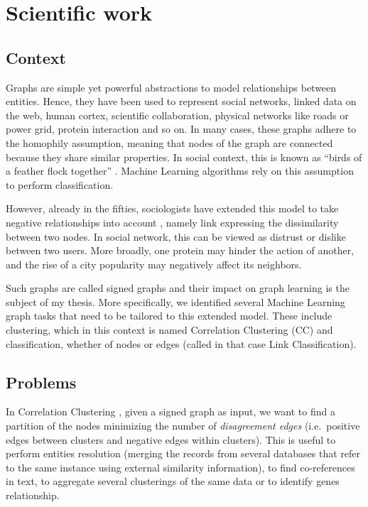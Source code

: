 \section{Scientific work}\label{scientific-work}

\subsection{Context}\label{context}

Graphs are simple yet powerful abstractions to model relationships between
entities. Hence, they have been used to represent social networks, linked data
on the web, human cortex, scientific collaboration, physical networks like
roads or power grid, protein interaction and so on. In many cases, these graphs
adhere to the homophily assumption, meaning that nodes of the graph are
connected because they share similar properties. In social context, this is
known as ``birds of a feather flock together'' \autocite{homophily01}. Machine
Learning algorithms rely on this assumption to perform classification.

However, already in the fifties, sociologists have extended this model to take
negative relationships into account \autocites{harary1953}{Cartwright56},
namely link expressing the dissimilarity between two nodes. In social network,
this can be viewed as distrust or dislike between two users. More broadly, one
protein may hinder the action of another, and the rise of a city popularity may
negatively affect its neighbors.

Such graphs are called signed graphs and their impact on graph learning is the
subject of my thesis. More specifically, we identified several Machine Learning
graph tasks that need to be tailored to this extended model. These include
clustering, which in this context is named Correlation Clustering (CC) and
classification, whether of nodes or edges (called in that case Link
Classification).

\subsection{Problems}\label{problems}

In Correlation Clustering \autocite{Bansal2002}, given a signed graph as input,
we want to find a partition of the nodes minimizing the number of
\emph{disagreement edges} (i.e.~positive edges between clusters and negative
edges within clusters). This is useful to perform entities resolution (merging
the records from several databases that refer to the same instance using
external similarity information), to find co-references in text, to aggregate
several clusterings of the same data or to identify genes relationship.

